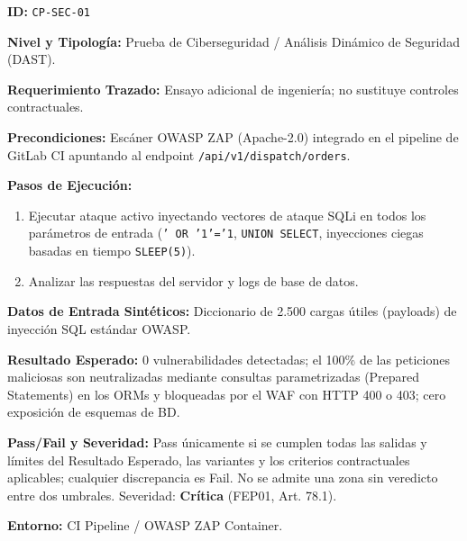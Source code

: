 \par\noindent\textbf{ID:} \texttt{C\allowbreak{}P\allowbreak{}-\allowbreak{}S\allowbreak{}E\allowbreak{}C\allowbreak{}-\allowbreak{}0\allowbreak{}1\allowbreak{}}\par
\par\noindent\textbf{Nivel y Tipología:} Prueba de Ciberseguridad / Análisis Dinámico de Seguridad (DAST).\par
\par\noindent\textbf{Requerimiento Trazado:} Ensayo adicional de ingeniería; no sustituye controles contractuales.\par
\par\noindent\textbf{Precondiciones:} Escáner OWASP ZAP (Apache-2.0) integrado en el pipeline de GitLab CI apuntando al endpoint \texttt{/\allowbreak{}a\allowbreak{}p\allowbreak{}i\allowbreak{}/\allowbreak{}v\allowbreak{}1\allowbreak{}/\allowbreak{}d\allowbreak{}i\allowbreak{}s\allowbreak{}p\allowbreak{}a\allowbreak{}t\allowbreak{}c\allowbreak{}h\allowbreak{}/\allowbreak{}o\allowbreak{}r\allowbreak{}d\allowbreak{}e\allowbreak{}r\allowbreak{}s\allowbreak{}}.\par
\par\noindent\textbf{Pasos de Ejecución:} \par
\begin{enumerate}
\item Ejecutar ataque activo inyectando vectores de ataque SQLi en todos los parámetros de entrada (\texttt{'\allowbreak{} O\allowbreak{}R\allowbreak{} '\allowbreak{}1\allowbreak{}'\allowbreak{}=\allowbreak{}'\allowbreak{}1\allowbreak{}}, \texttt{U\allowbreak{}N\allowbreak{}I\allowbreak{}O\allowbreak{}N\allowbreak{} S\allowbreak{}E\allowbreak{}L\allowbreak{}E\allowbreak{}C\allowbreak{}T\allowbreak{}}, inyecciones ciegas basadas en tiempo \texttt{S\allowbreak{}L\allowbreak{}E\allowbreak{}E\allowbreak{}P\allowbreak{}(\allowbreak{}5\allowbreak{})\allowbreak{}}).
\item Analizar las respuestas del servidor y logs de base de datos.
\end{enumerate}
\par\noindent\textbf{Datos de Entrada Sintéticos:} Diccionario de 2.500 cargas útiles (payloads) de inyección SQL estándar OWASP.\par
\par\noindent\textbf{Resultado Esperado:} 0 vulnerabilidades detectadas; el 100\% de las peticiones maliciosas son neutralizadas mediante consultas parametrizadas (Prepared Statements) en los ORMs y bloqueadas por el WAF con HTTP 400 o 403; cero exposición de esquemas de BD.\par
\par\noindent\textbf{Pass/Fail y Severidad:} Pass únicamente si se cumplen todas las salidas y límites del Resultado Esperado, las variantes y los criterios contractuales aplicables; cualquier discrepancia es Fail. No se admite una zona sin veredicto entre dos umbrales. Severidad: \textbf{Crítica} (FEP01, Art. 78.1).\par
\par\noindent\textbf{Entorno:} CI Pipeline / OWASP ZAP Container.\par






